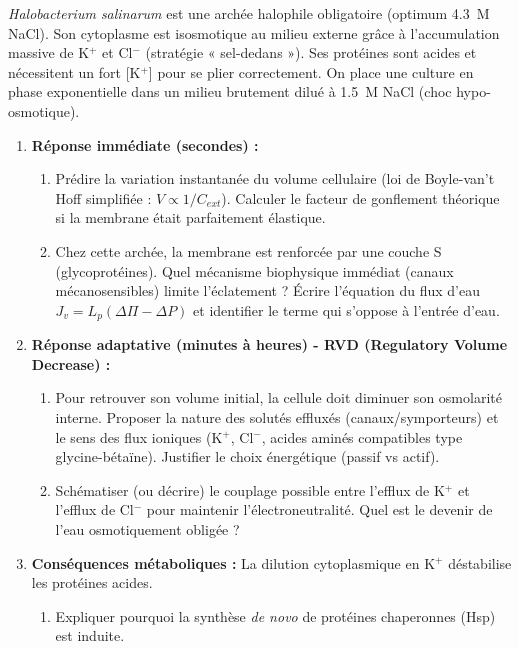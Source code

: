 \documentclass[11pt]{article}
\begin{document}
\begin{exercice}
\textit{Halobacterium salinarum} est une archée halophile obligatoire (optimum \SI{4,3}{M} NaCl). Son cytoplasme est isosmotique au milieu externe grâce à l'accumulation massive de K$^+$ et Cl$^-$ (stratégie « sel-dedans »). Ses protéines sont acides et nécessitent un fort [K$^+$] pour se plier correctement. On place une culture en phase exponentielle dans un milieu brutement dilué à \SI{1,5}{M} NaCl (choc hypo-osmotique).
\begin{enumerate}
    \item \textbf{Réponse immédiate (secondes) :} 
    \begin{enumerate}
        \item Prédire la variation instantanée du volume cellulaire (loi de Boyle-van't Hoff simplifiée : $V \propto 1/C_{ext}$). Calculer le facteur de gonflement théorique si la membrane était parfaitement élastique.
        \item Chez cette archée, la membrane est renforcée par une couche S (glycoprotéines). Quel mécanisme biophysique immédiat (canaux mécanosensibles) limite l'éclatement ? Écrire l'équation du flux d'eau $J_v = L_p (\Delta\Pi - \Delta P)$ et identifier le terme qui s'oppose à l'entrée d'eau.
    \end{enumerate}
    \item \textbf{Réponse adaptative (minutes à heures) - RVD (Regulatory Volume Decrease) :} 
    \begin{enumerate}
        \item Pour retrouver son volume initial, la cellule doit diminuer son osmolarité interne. Proposer la nature des solutés effluxés (canaux/symporteurs) et le sens des flux ioniques (K$^+$, Cl$^-$, acides aminés compatibles type glycine-bétaïne). Justifier le choix énergétique (passif vs actif).
        \item Schématiser (ou décrire) le couplage possible entre l'efflux de K$^+$ et l'efflux de Cl$^-$ pour maintenir l'électroneutralité. Quel est le devenir de l'eau osmotiquement obligée ?
    \end{enumerate}
    \item \textbf{Conséquences métaboliques :} La dilution cytoplasmique en K$^+$ déstabilise les protéines acides. 
    \begin{enumerate}
        \item Expliquer pourquoi la synthèse \textit{de novo} de protéines chaperonnes (Hsp) est induite.

\end{enumerate}
\end{enumerate}
\end{exercice}
\end{document}
